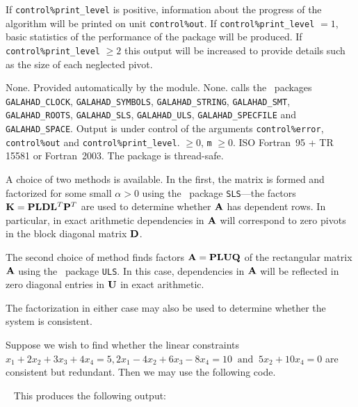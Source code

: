 \documentclass{galahad}
\newcommand{\packagename}{FDC}
\begin{document}

\galinfo
If {\tt control\%print\_level} is positive, information about the progress
of the algorithm will be printed on unit {\tt control\-\%out}.
If {\tt control\%print\_level} $= 1$, basic statistics of the performance of the
package will be produced.
If {\tt control\-\%print\_level} $\geq 2$ this
output will be increased to provide details such as the size of each
neglected pivot.


\galgeneral

\galcommon None.
\galworkspace Provided automatically by the module.
\galroutines None.
\galmodules {\tt \packagename\_find\_dependent} calls the \galahad\ packages
{\tt GALAHAD\_CLOCK},
{\tt GALAHAD\_SY\-M\-BOLS},
{\tt GALAHAD\_STRING},
{\tt GALAHAD\_SMT}, {\tt GALAHAD\_\-ROOTS}, {\tt GALAHAD\_\-SLS},
{\tt GALAHAD\_\-ULS}, {\tt GALAHAD\_SPECFILE} and {\tt GALAHAD\_SPACE}.
\galio Output is under control of the arguments
 {\tt control\%error}, {\tt control\%out} and {\tt control\%print\_level}.
 $\geq 0$, {\tt m} $\geq  0$.
\galportability ISO Fortran~95 + TR 15581 or Fortran~2003.
The package is thread-safe.


\galmethod

A choice of two methods is available. In the first, the matrix
is formed and factorized for some small $\alpha > 0$ using the
\libraryname\ package {\tt SLS}---the
factors ${\mathbf{K}} = {\mathbf{P}} {\mathbf{L}} {\mathbf{D}} {\mathbf{L}}^T {\mathbf{P}}^T$ are used to determine
whether ${\mathbf{A}}$ has dependent rows. In particular, in exact arithmetic
dependencies in ${\mathbf{A}}$ will correspond to zero pivots in the block
diagonal matrix ${\mathbf{D}}$.

The second choice of method finds factors
${\mathbf{A}} = {\mathbf{P}} {\mathbf{L}} {\mathbf{U}} {\mathbf{Q}}$ of the rectangular matrix ${\mathbf{A}}$
using the \libraryname\ package {\tt ULS}.
In this case, dependencies in ${\mathbf{A}}$ will be reflected in zero diagonal
entries in ${\mathbf{U}}$ in exact arithmetic.

The factorization in either case may also be used to
determine whether the system is consistent.


\galexample
Suppose we wish to find whether the linear constraints
$x_1 + 2 x_2 + 3 x_3 + 4 x_4 = 5, 2 x_1 - 4 x_2 + 6 x_3 - 8 x_4 = 10
\;\; \mbox{and} \;\; 5 x_2 + 10 x_4 = 0$
are consistent but redundant.
Then we may use the following code.

{\tt \small
\VerbatimInput{\packageexample}
}
\noindent
This produces the following output:
{\tt \small
\VerbatimInput{\packageresults}
}
\end{document}
